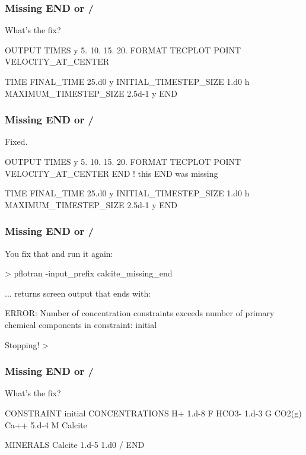 \documentclass[aspectratio=169]{beamer}
\newcommand\gehcomment[1]{{{\color{orange} #1}}}
\newcommand\redcomment[1]{{{\color{red} #1}}}
\newcommand\bluecomment[1]{{{\color{blue} #1}}}
\newcommand\greencomment[1]{{{\color{green} #1}}}
\newcommand\magentacomment[1]{{{\color{magenta} #1}}}
\begin{document}
\begin{frame}\frametitle{Missing \greencomment{END} or \greencomment{/}}
\redcomment{What's the fix?}
\begin{semiverbatim}

OUTPUT
  TIMES y 5. 10. 15. 20.
  FORMAT TECPLOT POINT
  VELOCITY_AT_CENTER

TIME
  FINAL_TIME 25.d0 y
  INITIAL_TIMESTEP_SIZE 1.d0 h
  MAXIMUM_TIMESTEP_SIZE 2.5d-1 y
END
\end{semiverbatim}

\end{frame}

\begin{frame}\frametitle{Missing \greencomment{END} or \greencomment{/}}
\redcomment{Fixed.}
\begin{semiverbatim}

OUTPUT
  TIMES y 5. 10. 15. 20.
  FORMAT TECPLOT POINT
  VELOCITY_AT_CENTER
\magentacomment{END} \bluecomment{! this \greencomment{END} was missing}

TIME
  FINAL_TIME 25.d0 y
  INITIAL_TIMESTEP_SIZE 1.d0 h
  MAXIMUM_TIMESTEP_SIZE 2.5d-1 y
END
\end{semiverbatim}

\end{frame}

\begin{frame}\frametitle{Missing \greencomment{END} or \greencomment{/}}
\redcomment{You fix that and run it again:}
\begin{semiverbatim}

> pflotran -input_prefix calcite_missing_end

... \gehcomment{returns screen output that ends with:}

  ERROR: Number of concentration constraints exceeds number of primary
  chemical components in constraint: initial

  Stopping!
>
\end{semiverbatim}

\end{frame}

\begin{frame}\frametitle{Missing \greencomment{END} or \greencomment{/}}
\redcomment{What's the fix?}
\begin{semiverbatim}

CONSTRAINT initial
  CONCENTRATIONS
    H+     1.d-8      F
    HCO3-  1.d-3      G  CO2(g)
    Ca++   5.d-4      M  Calcite

  MINERALS
    Calcite 1.d-5 1.d0
  /
END
\end{semiverbatim}

\end{frame}
\end{document}
